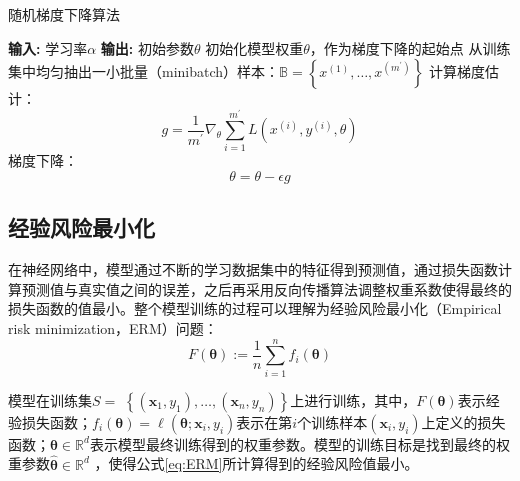 \begin{algorithm}[!htb]
	\caption{随机梯度下降算法}
	\label{随机梯度下降算法}
	\begin{algorithmic}[1]
		\footnotesize
		\STATE \textbf{输入:} 学习率$\alpha$
		\STATE \textbf{输出:} 初始参数$\theta$
		\STATE 初始化模型权重$\theta$，作为梯度下降的起始点
		\STATE 从训练集中均匀抽出一小批量（minibatch）样本：$\mathbb{B}=\left\{x^{(1)}, \ldots, x^{\left(m^{\prime}\right)}\right\}$
		\STATE 计算梯度估计：$$
g=\frac{1}{m^{\prime}} \nabla_{\theta} \sum_{i=1}^{m^{\prime}} L\left(x^{(i)}, y^{(i)}, \theta\right)
$$
		\STATE 梯度下降：$$
\theta=\theta-\epsilon g
$$
		\ENDWHILE
	\end{algorithmic}
\end{algorithm}

\subsection{经验风险最小化}
在神经网络中，模型通过不断的学习数据集中的特征得到预测值，通过损失函数计算预测值与真实值之间的误差，之后再采用反向传播算法调整权重系数使得最终的损失函数的值最小。整个模型训练的过程可以理解为经验风险最小化（Empirical risk minimization，ERM）问题：
\begin{equation}\label{eq:ERM}
F(\boldsymbol{\theta}):=\frac{1}{n} \sum_{i=1}^{n} f_{i}(\boldsymbol{\theta})
\end{equation}

模型在训练集$S=$ $\left\{\left(\mathbf{x}_{1}, y_{1}\right), \ldots,\left(\mathbf{x}_{n}, y_{n}\right)\right\}$上进行训练，其中，$F(\boldsymbol{\theta})$表示经验损失函数；$f_{i}(\boldsymbol{\theta})=\ell\left(\boldsymbol{\theta} ; \mathbf{x}_{i}, y_{i}\right)$表示在第$i$个训练样本$\left(\mathbf{x}_{i}, y_{i}\right)$上定义的损失函数；$\boldsymbol{\theta} \in \mathbb{R}^{d}$表示模型最终训练得到的权重参数。模型的训练目标是找到最终的权重参数$\widehat{\boldsymbol{\theta}} \in \mathbb{R}^{d}$ ，使得公式\ref{eq:ERM}所计算得到的经验风险值最小。


